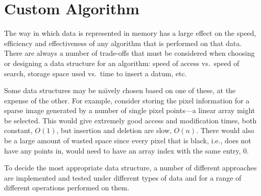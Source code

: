 
\part{Custom Algorithm}
\label{prt:custom_algorithm}

The way in which data is represented in memory has a large effect on the speed,
efficiency and effectiveness of any algorithm that is performed on that data.
There are always a number of trade-offs that must be considered when choosing
or designing a data structure for an algorithm: speed of access vs.\ speed of
search, storage space used vs.\ time to insert a datum, etc.

Some data structures may be na\"{\i}vely chosen based on one of these, at the
expense of the other. For example, consider storing the pixel information for a
sparse image generated by a number of single pixel points---a linear array
might be selected. This would give extremely good access and modification
times, both constant, $O(1)$, but insertion and deletion are slow, $O(n)$.
There would also be a large amount of wasted space since every pixel that is
black, i.e., does not have any points in, would need to have an array index
with the same entry, $0$.

To decide the most appropriate data structure, a number of different approaches
are implemented and tested under different types of data and for a range of
different operations performed on them.
